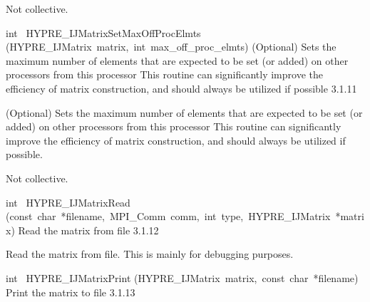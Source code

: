 \documentclass{article}
\begin{document}
\begin{cxxentry}
\begin{cxxentry}
\begin{cxxfunction}
\begin{cxxdoc}
Not collective.
\end{cxxdoc}
\end{cxxfunction}
\begin{cxxfunction}
{int\ }
        {HYPRE\_IJMatrixSetMaxOffProcElmts}
        {(HYPRE\_IJMatrix\ matrix,\ int\ max\_off\_proc\_elmts)}
        {
(Optional) Sets the maximum number of elements that are expected to be set
(or added) on other processors from this processor
This routine can significantly improve the efficiency of matrix
construction, and should always be utilized if possible}
        {3.1.11}
\begin{cxxdoc}

(Optional) Sets the maximum number of elements that are expected to be set
(or added) on other processors from this processor
This routine can significantly improve the efficiency of matrix
construction, and should always be utilized if possible.

Not collective.
\end{cxxdoc}
\end{cxxfunction}
\begin{cxxfunction}
{int\ }
        {HYPRE\_IJMatrixRead}
        {(const\ char\ *filename,\ MPI\_Comm\ comm,\ int\ type,\ HYPRE\_IJMatrix\ *matrix)}
        {
Read the matrix from file}
        {3.1.12}
\begin{cxxdoc}

Read the matrix from file.  This is mainly for debugging purposes.
\end{cxxdoc}
\end{cxxfunction}
\begin{cxxfunction}
{int\ }
        {HYPRE\_IJMatrixPrint}
        {(HYPRE\_IJMatrix\ matrix,\ const\ char\ *filename)}
        {
Print the matrix to file}
        {3.1.13}
\begin{cxxdoc}


\end{cxxdoc}
\end{cxxfunction}
\end{cxxentry}
\end{cxxentry}
\end{document}
